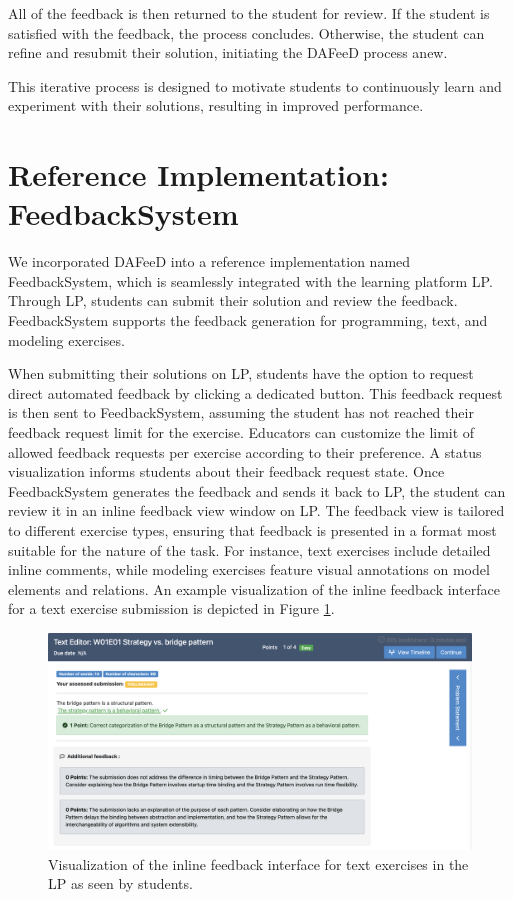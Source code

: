 \documentclass[sigconf,screen,review,anonymous]{acmart}
\begin{document}
All of the feedback is then returned to the student for review.
If the student is satisfied with the feedback, the process concludes. 
Otherwise, the student can refine and resubmit their solution, initiating the DAFeeD process anew.

This iterative process is designed to motivate students to continuously learn and experiment with their solutions, resulting in improved performance.

\section{Reference Implementation: FeedbackSystem} %
\label{sec:reference-implementation}

We incorporated DAFeeD into a reference implementation named FeedbackSystem, which is seamlessly integrated with the learning platform LP. 
Through LP, students can submit their solution and review the feedback.
FeedbackSystem supports the feedback generation for programming, text, and modeling exercises.

When submitting their solutions on LP, students have the option to request direct automated feedback by clicking a dedicated button.
This feedback request is then sent to FeedbackSystem, assuming the student has not reached their feedback request limit for the exercise.
Educators can customize the limit of allowed feedback requests per exercise according to their preference.
A status visualization informs students about their feedback request state.
Once FeedbackSystem generates the feedback and sends it back to LP, the student can review it in an inline feedback view window on LP.
The feedback view is tailored to different exercise types, ensuring that feedback is presented in a format most suitable for the nature of the task.
For instance, text exercises include detailed inline comments, while modeling exercises feature visual annotations on model elements and relations.
An example visualization of the inline feedback interface for a text exercise submission is depicted in Figure \ref{fig:Artemis-feedback-visualization}.

\begin{figure}[htbp]
  \centering
  \includegraphics[width=\linewidth]{figures/text-feedback-viewer-cut.png}
  \vspace{-5mm}
  \caption{Visualization of the inline feedback interface for text exercises in the LP as seen by students.}
  \label{fig:Artemis-feedback-visualization}
  \vspace{-3mm}
\end{figure}
\end{document}
